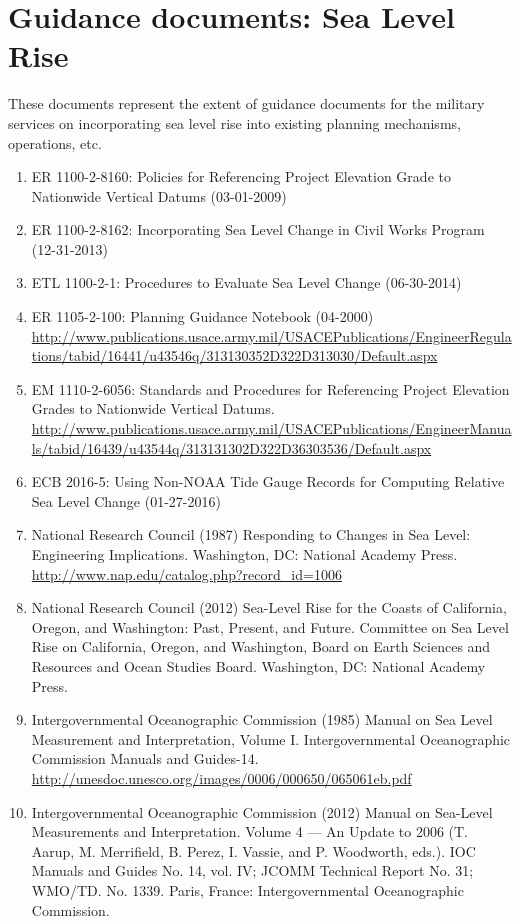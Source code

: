 \documentclass[10pt]{amsart}
\begin{document}
\section{Guidance documents: Sea Level Rise}
These documents represent the extent of guidance documents for the military services on incorporating sea level rise into existing planning mechanisms, operations, etc.

\begin{enumerate}
\item ER 1100-2-8160: Policies for Referencing Project Elevation Grade to Nationwide Vertical Datums (03-01-2009)
\item ER 1100-2-8162: Incorporating Sea Level Change in Civil Works Program (12-31-2013)
\item ETL 1100-2-1: Procedures to Evaluate Sea Level Change (06-30-2014)
\item ER 1105-2-100: Planning Guidance Notebook (04-2000) \url{http://www.publications.usace.army.mil/USACEPublications/EngineerRegulations/tabid/16441/u43546q/313130352D322D313030/Default.aspx}
\item EM 1110-2-6056: Standards and Procedures for Referencing Project Elevation Grades to Nationwide Vertical Datums. \url{http://www.publications.usace.army.mil/USACEPublications/EngineerManuals/tabid/16439/u43544q/313131302D322D36303536/Default.aspx}
\item ECB 2016-5: Using Non-NOAA Tide Gauge Records for Computing Relative Sea Level Change (01-27-2016)
\item National Research Council (1987) Responding to Changes in Sea Level: Engineering Implications. Washington, DC: National Academy Press. \url{http://www.nap.edu/catalog.php?record_id=1006}
\item National Research Council (2012) Sea-Level Rise for the Coasts of California, Oregon, and Washington: Past, Present, and Future. Committee on Sea Level Rise on California, Oregon, and Washington, Board on Earth Sciences and Resources and Ocean Studies Board. Washington, DC: National Academy Press.
\item Intergovernmental Oceanographic Commission (1985) Manual on Sea Level Measurement and Interpretation, Volume I. Intergovernmental Oceanographic Commission Manuals and Guides-14. \url{http://unesdoc.unesco.org/images/0006/000650/065061eb.pdf}
\item Intergovernmental Oceanographic Commission (2012) Manual on Sea-Level Measurements and Interpretation. Volume 4 — An Update to 2006 (T. Aarup, M. Merrifield, B. Perez, I. Vassie, and P. Woodworth, eds.). IOC Manuals and Guides No. 14, vol. IV; JCOMM Technical Report No. 31; WMO/TD. No. 1339. Paris, France: Intergovernmental Oceanographic Commission.

\end{enumerate}
\end{document}
